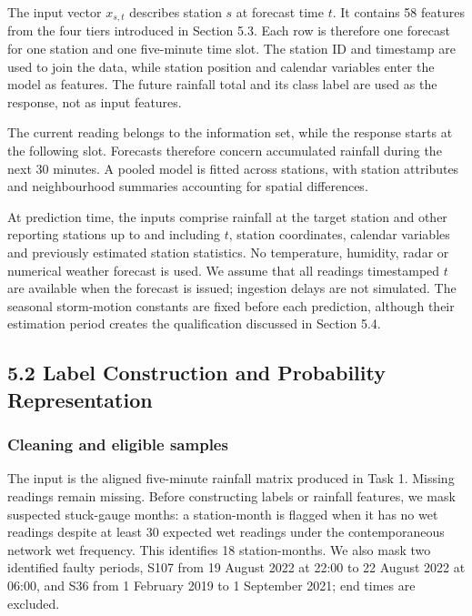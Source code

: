 \documentclass[11pt,a4paper]{article}
\begin{document}
The input vector \(x_{s,t}\) describes station \(s\) at forecast time \(t\). It contains 58 features from the four tiers introduced in Section 5.3. Each row is therefore one forecast for one station and one five-minute time slot. The station ID and timestamp are used to join the data, while station position and calendar variables enter the model as features. The future rainfall total and its class label are used as the response, not as input features.


The current reading belongs to the information set, while the response starts at the following slot. Forecasts therefore concern accumulated rainfall during the next 30 minutes. A pooled model is fitted across stations, with station attributes and neighbourhood summaries accounting for spatial differences.


At prediction time, the inputs comprise rainfall at the target station and other reporting stations up to and including \(t\), station coordinates, calendar variables and previously estimated station statistics. No temperature, humidity, radar or numerical weather forecast is used. We assume that all readings timestamped \(t\) are available when the forecast is issued; ingestion delays are not simulated. The seasonal storm-motion constants are fixed before each prediction, although their estimation period creates the qualification discussed in Section 5.4. 


\subsection*{5.2 Label Construction and Probability Representation}
{}


\subsubsection*{Cleaning and eligible samples}
{}


The input is the aligned five-minute rainfall matrix produced in Task 1. Missing readings remain missing. Before constructing labels or rainfall features, we mask suspected stuck-gauge months: a station-month is flagged when it has no wet readings despite at least 30 expected wet readings under the contemporaneous network wet frequency. This identifies 18 station-months. We also mask two identified faulty periods, S107 from 19 August 2022 at 22:00 to 22 August 2022 at 06:00, and S36 from 1 February 2019 to 1 September 2021; end times are excluded.
\end{document}
